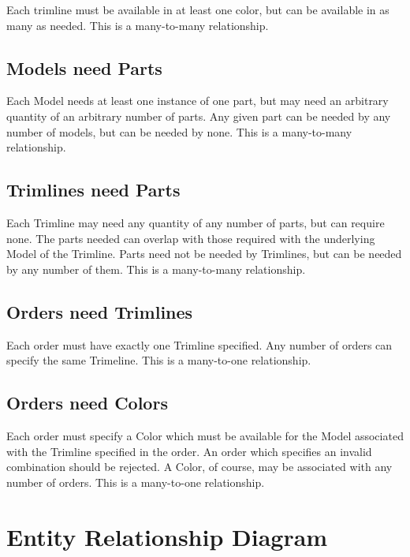 \documentclass[11pt,letterpaper,oneside]{amsart}
\begin{document}
Each trimline must be available in at least one color, but can be available in as many as needed.  This is a many-to-many relationship.

\subsection*{Models need Parts}

Each Model needs at least one instance of one part, but may need an arbitrary quantity of an arbitrary number of parts.  Any given part can be needed by any number of models, but can be needed by none.  This is a many-to-many relationship.

\subsection*{Trimlines need Parts}

Each Trimline may need any quantity of any number of parts, but can require none.  The parts needed can overlap with those required with the underlying Model of the Trimline.  Parts need not be needed by Trimlines, but can be needed by any number of them.  This is a many-to-many relationship. 

\subsection*{Orders need Trimlines}

Each order must have exactly one Trimline specified.  Any number of orders can specify the same Trimeline.  This is a many-to-one relationship.

\subsection*{Orders need Colors}

Each order must specify a Color which must be available for the Model associated with the Trimline specified in the order.  An order which specifies an invalid combination should be rejected.  A Color, of course, may be associated with any number of orders.  This is a many-to-one relationship.

\section*{Entity Relationship Diagram}
\end{document}
